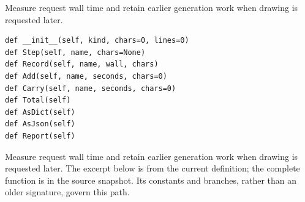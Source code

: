 Measure request wall time and retain earlier generation work when drawing is requested later.


\begin{lstlisting}[style=plain]
def __init__(self, kind, chars=0, lines=0)
def Step(self, name, chars=None)
def Record(self, name, wall, chars)
def Add(self, name, seconds, chars=0)
def Carry(self, name, seconds, chars=0)
def Total(self)
def AsDict(self)
def AsJson(self)
def Report(self)
\end{lstlisting}
Measure request wall time and retain earlier generation work when drawing is requested later. The excerpt below is from the current definition; the complete function is in the source snapshot. Its constants and branches, rather than an older signature, govern this path.


